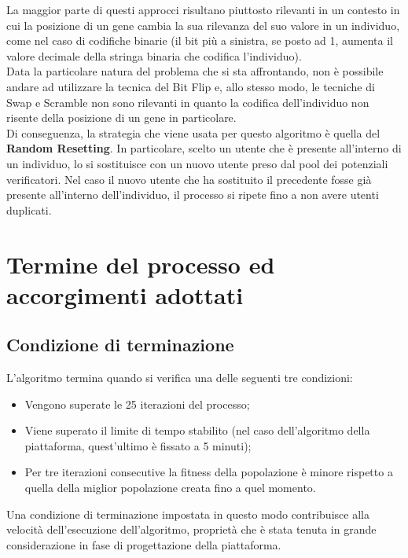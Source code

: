        La maggior parte di questi approcci risultano piuttosto rilevanti in un contesto in cui la posizione di un gene cambia la sua rilevanza del suo valore in un individuo, come nel caso di codifiche binarie (il bit più a sinistra, se posto ad 1, aumenta il valore decimale della stringa binaria che codifica l'individuo). \\
        Data la particolare natura del problema che si sta affrontando, non è possibile andare ad utilizzare la tecnica del Bit Flip e, allo stesso modo, le tecniche di Swap e Scramble non sono rilevanti in quanto la codifica dell'individuo non risente della posizione di un gene in particolare. \\
        Di conseguenza, la strategia che viene usata per questo algoritmo è quella del \textbf{Random Resetting}. In particolare, scelto un utente che è presente all'interno di un individuo, lo si sostituisce con un nuovo utente preso dal pool dei potenziali verificatori. Nel caso il nuovo utente che ha sostituito il precedente fosse già presente all'interno dell'individuo, il processo si ripete fino a non avere utenti duplicati.
        \newpage
\section{Termine del processo ed accorgimenti adottati}

    \subsection{Condizione di terminazione}
        L'algoritmo termina quando si verifica una delle seguenti tre condizioni:

        \begin{itemize}
            \item Vengono superate le 25 iterazioni del processo;
            \item Viene superato il limite di tempo stabilito (nel caso dell'algoritmo della piattaforma, quest'ultimo è fissato a 5 minuti);
            \item Per tre iterazioni consecutive la fitness della popolazione è minore rispetto a quella della miglior popolazione creata fino a quel momento.
        \end{itemize}

        Una condizione di terminazione impostata in questo modo contribuisce alla velocità dell'esecuzione dell'algoritmo, proprietà che è stata tenuta in grande considerazione in fase di progettazione della piattaforma.

